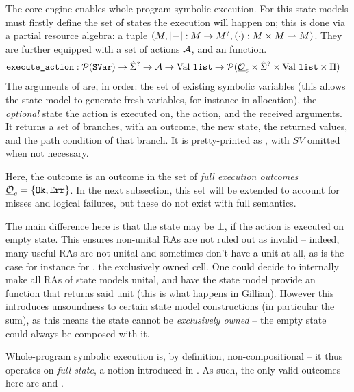 \newcommand{\vallist}[0]{\Val~\code{list}}

The core engine enables whole-program symbolic execution. For this state models must firstly define the set of states the execution will happen on; this is done via a partial resource algebra: a tuple  $(M, |\!-\!|:M\rightarrow M^?,(\cdot):M\times M\rightharpoonup M)$. They are further equipped with a set of actions $\cal A$, and an \execac{} function.
\begin{align*}
	\execac &: \pset(\code{SVar})\rarr \Sst^? \rarr {\cal A} \rarr \vallist \rarr \pset(\full\outcomes_e \times \Sst^? \times \vallist \times \Pc)
\end{align*}
The arguments of \execac{} are, in order: the set of existing symbolic variables (this allows the state model to generate fresh variables, for instance in allocation), the \emph{optional} state the action is executed on, the action, and the received arguments. It returns a set of branches, with an outcome, the new state, the returned values, and the path condition of that branch. It is pretty-printed as , with $SV$ omitted when not necessary.

Here, the outcome is an outcome in the set of \emph{full execution outcomes} $\underline{{\cal O}}_e=\{ \texttt{Ok},\texttt{Err} \}$. In the next subsection, this set will be extended to account for misses and logical failures, but these do not exist with full semantics.

The main difference here is that the state may be $\bot$, if the action is executed on empty state. This ensures non-unital RAs are not ruled out as invalid -- indeed, many useful RAs are not unital and sometimes don't have a unit at all, as is the case for instance for \Ex, the exclusively owned cell. One could decide to internally make all RAs of state models unital, and have the state model provide an  function that returns said unit (this is what happens in Gillian). However this introduces unsoundness to certain state model constructions (in particular the sum), as this means the state cannot be \emph{exclusively owned} -- the empty state could always be composed with it.

Whole-program symbolic execution is, by definition, non-compositional -- it thus operates on \emph{full state}, a notion introduced in \cite{sacha-phd}. As such, the only valid outcomes here are \Ok{} and \Err{}.

